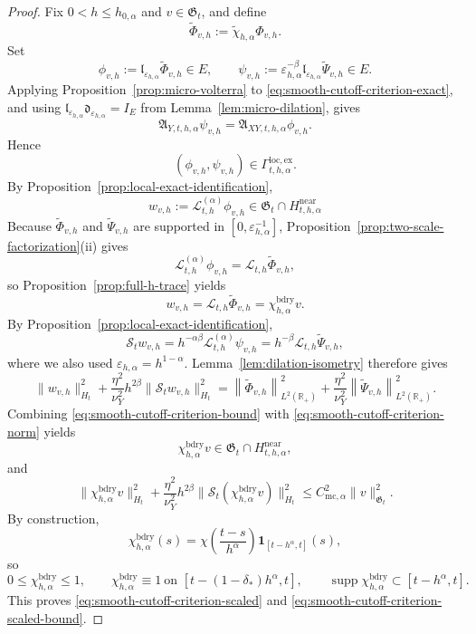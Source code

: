 \documentclass[11pt,a4paper]{amsart}
\theoremstyle{plain}
\theoremstyle{definition}
\theoremstyle{remark}
\newcommand{\R}{\mathbb{R}}
\newcommand{\one}{\mathbf 1}
\begin{document}
\begin{proof}
Fix \(0<h\le h_{0,\alpha}\) and \(v\in\mathfrak G_t\), and define
\[
\widetilde\Phi_{v,h}:=\widetilde\chi_{h,\alpha}\Phi_{v,h}.
\]
Set
\[
\phi_{v,h}:=
\mathfrak l_{\varepsilon_{h,\alpha}}\widetilde\Phi_{v,h}\in E,
\qquad
\psi_{v,h}:=
\varepsilon_{h,\alpha}^{-\beta}
\mathfrak l_{\varepsilon_{h,\alpha}}\widetilde\Psi_{v,h}\in E.
\]
Applying Proposition~\ref{prop:micro-volterra} to
\eqref{eq:smooth-cutoff-criterion-exact}, and using
\(\mathfrak l_{\varepsilon_{h,\alpha}}\mathfrak d_{\varepsilon_{h,\alpha}}=I_E\) from
Lemma~\ref{lem:micro-dilation}, gives
\[
\mathfrak A_{Y,t,h,\alpha}\psi_{v,h}
=
\mathfrak A_{XY,t,h,\alpha}\phi_{v,h}.
\]
Hence
\[
(\phi_{v,h},\psi_{v,h})\in \Gamma_{t,h,\alpha}^{\mathrm{loc,ex}}.
\]
By Proposition~\ref{prop:local-exact-identification},
\[
w_{v,h}:=
\mathcal L_{t,h}^{(\alpha)}\phi_{v,h}
\in
\mathfrak G_t\cap H_{t,h,\alpha}^{\mathrm{near}}
\]
Because \(\widetilde\Phi_{v,h}\) and \(\widetilde\Psi_{v,h}\) are supported in
\([0,\varepsilon_{h,\alpha}^{-1}]\), Proposition~\ref{prop:two-scale-factorization}(ii) gives
\[
\mathcal L_{t,h}^{(\alpha)}\phi_{v,h}
=
\mathcal L_{t,h}\widetilde\Phi_{v,h},
\]
so Proposition~\ref{prop:full-h-trace} yields
\[
w_{v,h}
=
\mathcal L_{t,h}\widetilde\Phi_{v,h}
=
\chi_{h,\alpha}^{\mathrm{bdry}}v.
\]
By Proposition~\ref{prop:local-exact-identification},
\[
\mathcal S_t w_{v,h}
=
h^{-\alpha\beta}\mathcal L_{t,h}^{(\alpha)}\psi_{v,h}
=
h^{-\beta}\mathcal L_{t,h}\widetilde\Psi_{v,h},
\]
where we also used \(\varepsilon_{h,\alpha}=h^{1-\alpha}\). Lemma~\ref{lem:dilation-isometry}
therefore gives
\begin{equation}\label{eq:smooth-cutoff-criterion-norm}
\|w_{v,h}\|_{H_t}^2
+
\frac{\eta^2}{\nu_Y^2}
h^{2\beta}\|\mathcal S_t w_{v,h}\|_{H_t}^2
=
\left\|
\widetilde\Phi_{v,h}
\right\|_{L^2(\R_+)}^2
+
\frac{\eta^2}{\nu_Y^2}
\left\|
\widetilde\Psi_{v,h}
\right\|_{L^2(\R_+)}^2.
\end{equation}
Combining
\eqref{eq:smooth-cutoff-criterion-bound} with
\eqref{eq:smooth-cutoff-criterion-norm} yields
\[
\chi_{h,\alpha}^{\mathrm{bdry}}v\in \mathfrak G_t\cap H_{t,h,\alpha}^{\mathrm{near}},
\]
and
\[
\|\chi_{h,\alpha}^{\mathrm{bdry}}v\|_{H_t}^2
+
\frac{\eta^2}{\nu_Y^2}
h^{2\beta}
\|\mathcal S_t(\chi_{h,\alpha}^{\mathrm{bdry}}v)\|_{H_t}^2
\le
C_{\mathrm{mc},\alpha}^2\|v\|_{\mathfrak G_t}^2.
\]
By construction,
\[
\chi_{h,\alpha}^{\mathrm{bdry}}(s)
=
\chi\!\left(\frac{t-s}{h^\alpha}\right)\one_{[t-h^\alpha,t]}(s),
\]
so
\[
0\le \chi_{h,\alpha}^{\mathrm{bdry}}\le1,
\qquad
\chi_{h,\alpha}^{\mathrm{bdry}}\equiv1
\ \text{on }[t-(1-\delta_*)h^\alpha,t],
\qquad
\operatorname{supp}\chi_{h,\alpha}^{\mathrm{bdry}}\subset[t-h^\alpha,t].
\]
This proves \eqref{eq:smooth-cutoff-criterion-scaled} and
\eqref{eq:smooth-cutoff-criterion-scaled-bound}.
\end{proof}
\end{document}
